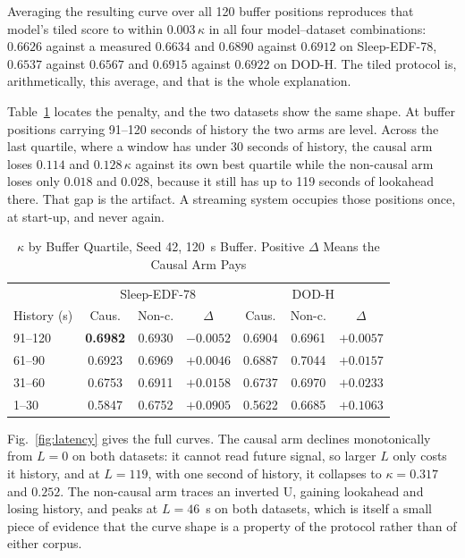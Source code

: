 \documentclass[conference]{IEEEtran}
\begin{document}
Averaging the resulting curve over all 120 buffer positions reproduces that model's tiled score to
within $0.003\,\kappa$ in all four model--dataset combinations: $0.6626$ against a measured
$0.6634$ and $0.6890$ against $0.6912$ on Sleep-EDF-78, $0.6537$ against $0.6567$ and $0.6915$
against $0.6922$ on DOD-H. The tiled protocol is, arithmetically, this average, and that is the
whole explanation.

Table~\ref{tab:quartile} locates the penalty, and the two datasets show the same shape. At buffer
positions carrying 91--120 seconds of history the two arms are level. Across the last quartile,
where a window has under 30 seconds of history, the causal arm loses $0.114$ and $0.128\,\kappa$
against its own best quartile while the non-causal arm loses only $0.018$ and $0.028$, because it
still has up to 119 seconds of lookahead there. That gap is the artifact. A streaming system
occupies those positions once, at start-up, and never again.

\begin{table}[t]
\caption{$\kappa$ by Buffer Quartile, Seed 42, 120~s Buffer. Positive $\Delta$ Means the Causal Arm
Pays}
\label{tab:quartile}
\centering
\footnotesize
\setlength{\tabcolsep}{3.6pt}
\begin{tabular}{lccc|ccc}
\toprule
 & \multicolumn{3}{c|}{Sleep-EDF-78} & \multicolumn{3}{c}{DOD-H} \\
History (s) & Caus. & Non-c. & $\Delta$ & Caus. & Non-c. & $\Delta$ \\
\midrule
91--120 & \textbf{0.6982} & 0.6930 & $-0.0052$ & 0.6904 & 0.6961 & $+0.0057$ \\
61--90  & 0.6923 & 0.6969 & $+0.0046$ & 0.6887 & 0.7044 & $+0.0157$ \\
31--60  & 0.6753 & 0.6911 & $+0.0158$ & 0.6737 & 0.6970 & $+0.0233$ \\
1--30   & 0.5847 & 0.6752 & $+0.0905$ & 0.5622 & 0.6685 & $+0.1063$ \\
\bottomrule
\end{tabular}
\end{table}

Fig.~\ref{fig:latency} gives the full curves. The causal arm declines monotonically from $L = 0$ on
both datasets: it cannot read future signal, so larger $L$ only costs it history, and at $L = 119$,
with one second of history, it collapses to $\kappa = 0.317$ and $0.252$. The non-causal arm traces
an inverted U, gaining lookahead and losing history, and peaks at $L = 46$~s on both datasets, which
is itself a small piece of evidence that the curve shape is a property of the protocol rather than
of either corpus.
\end{document}
